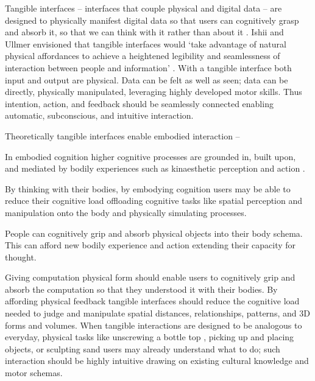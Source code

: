 
Tangible interfaces 
-- interfaces that couple physical and digital data \cite{Dourish2001} -- 
are designed to physically manifest digital data 
so that users can cognitively grasp and absorb it,
so that we can think with it rather than about it \cite{Kirsh2013}. 
%
Ishii and Ullmer envisioned that tangible interfaces would  
`take advantage of natural physical affordances 
to achieve a heightened legibility and seamlessness of interaction 
between people and information' \cite{Ishii1997}. 
%
With a tangible interface both input and output are physical. 
%
Data can be felt as well as seen; 
data can be directly, physically manipulated, 
leveraging highly developed motor skills. 
%
Thus intention, action, and feedback 
should be seamlessly connected 
enabling automatic, subconscious, and intuitive interaction.


Theoretically tangible interfaces enable embodied interaction --




%
In embodied cognition higher cognitive processes are 
grounded in, built upon, and mediated by bodily experiences 
such as kinaesthetic perception and action \cite{Hardy-Vallee2008}. 


%
By thinking with their bodies, by embodying cognition 
users may be able to reduce their cognitive load
offloading cognitive tasks like 
spatial perception and manipulation 
onto the body and 
physically simulating processes.

%
People can cognitively grip and absorb physical objects into their body schema.
This can afford new bodily experience and action
extending their capacity for thought. 

Giving computation physical form 
should enable users to cognitively grip and absorb the computation 
so that they understood it with their bodies.
%
By affording physical feedback tangible interfaces should
reduce the cognitive load needed to judge and manipulate spatial distances, 
relationships, patterns, and 3D forms and volumes. 
%
When tangible interactions are designed to be 
analogous to everyday, physical tasks 
like unscrewing a bottle top \cite{Kirsh2013}, 
picking up and placing objects, 
or sculpting sand 
users may already understand what to do; 
such interaction should be highly intuitive
drawing on existing cultural knowledge and motor schemas. 

